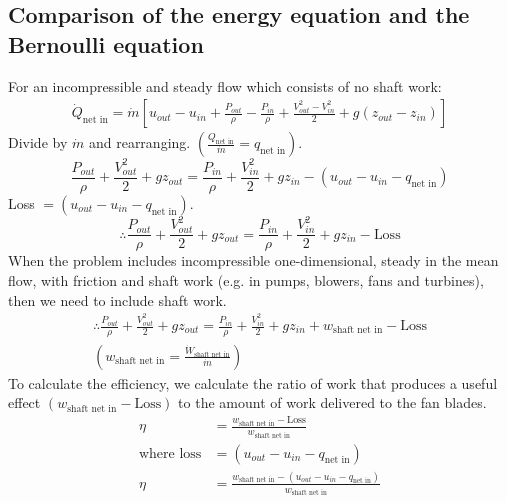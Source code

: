\documentclass[class=report, crop=false, 12pt,a4paper]{standalone}
\begin{document}
\subsection{Comparison of the energy equation and the Bernoulli equation}
For an incompressible and steady flow which consists of no shaft work:
\begin{multline}
  \dot{Q}_{\textrm{net in}} = \dot{m} \left[ u_{out} - u_{in} + \frac{P_{out}}{\rho} - \frac{P_{in}}{\rho} + \frac{V_{out}^2 - V_{in}^2}{2} + g(z_{out} - z_{in}) \right]
\end{multline}
Divide by $\dot{m}$ and rearranging. $(\frac{Q_{\textrm{net in}}}{\dot{m}} = q_{\textrm{net in}})$.
\begin{equation}
  \frac{P_{out}}{\rho} + \frac{V_{out}^2}{2} + gz_{out} = \frac{P_{in}}{\rho} + \frac{V_{in}^2}{2} + gz_{in} - (u_{out} - u_{in} - q_{\textrm{net in}})
\end{equation}
Loss $= (u_{out} - u_{in} - q_{\textrm{net in}})$.
\begin{equation}
  \therefore \frac{P_{out}}{\rho} + \frac{V_{out}^2}{2} + gz_{out} = \frac{P_{in}}{\rho} + \frac{V_{in}^2}{2} + gz_{in} - \textrm{Loss}
\end{equation}
When the problem includes incompressible one-dimensional, steady in the mean flow, with friction and shaft work (e.g. in pumps, blowers, fans and turbines), then we need to include shaft work.
\begin{gather}
  \therefore \frac{P_{out}}{\rho} + \frac{V_{out}^2}{2} + gz_{out} = \frac{P_{in}}{\rho} + \frac{V_{in}^2}{2} + gz_{in} + w_{\textrm{shaft net in}} - \textrm{Loss}\\
  (w_{\textrm{shaft net in}} = \frac{\dot{W}_{\textrm{shaft net in}}}{\dot{m}})
\end{gather}
To calculate the efficiency, we calculate the ratio of work that produces a useful effect $(w_{\textrm{shaft net in}} - \textrm{Loss})$ to the amount of work delivered to the fan blades.
\begin{align}
  \eta &= \frac{w_{\textrm{shaft net in}} - \textrm{Loss}}{w_{\textrm{shaft net in}}}\\
  \textrm{where loss} &= (u_{out} - u_{in} - q_{\textrm{net in}})\\
  \eta &= \frac{w_{\textrm{shaft net in}} - (u_{out} - u_{in} - q_{\textrm{net in}})}{w_{\textrm{shaft net in}}}
\end{align}
\end{document}
